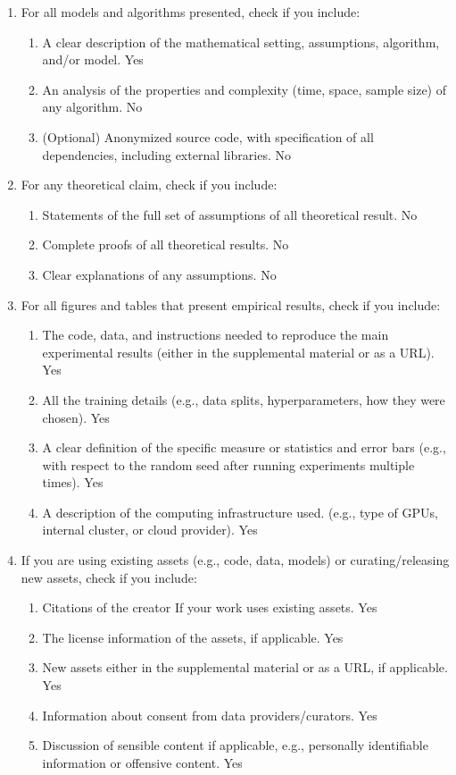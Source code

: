 \documentclass[twoside]{article}
\begin{document}
\begin{enumerate}

  \item For all models and algorithms presented, check if you include:
  \begin{enumerate}
    \item A clear description of the mathematical setting, assumptions, algorithm, and/or model. Yes
    \item An analysis of the properties and complexity (time, space, sample size) of any algorithm. No
    \item (Optional) Anonymized source code, with specification of all dependencies, including external libraries. No
  \end{enumerate}

  \item For any theoretical claim, check if you include:
  \begin{enumerate}
    \item Statements of the full set of assumptions of all theoretical result. No
    \item Complete proofs of all theoretical results. No
    \item Clear explanations of any assumptions. No 
  \end{enumerate}

  \item For all figures and tables that present empirical results, check if you include:
  \begin{enumerate}
    \item The code, data, and instructions needed to reproduce the main experimental results (either in the supplemental material or as a URL). Yes
    \item All the training details (e.g., data splits, hyperparameters, how they were chosen). Yes
    \item A clear definition of the specific measure or statistics and error bars (e.g., with respect to the random seed after running experiments multiple times). Yes
    \item A description of the computing infrastructure used. (e.g., type of GPUs, internal cluster, or cloud provider). Yes
  \end{enumerate}

  \item If you are using existing assets (e.g., code, data, models) or curating/releasing new assets, check if you include:
  \begin{enumerate}
    \item Citations of the creator If your work uses existing assets. Yes
    \item The license information of the assets, if applicable. Yes
    \item New assets either in the supplemental material or as a URL, if applicable. Yes
    \item Information about consent from data providers/curators. Yes
    \item Discussion of sensible content if applicable, e.g., personally identifiable information or offensive content. Yes
  \end{enumerate}


\end{enumerate}
\end{document}
